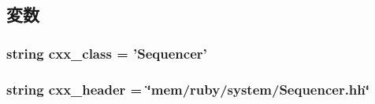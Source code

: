 \subsection{変数}
\hypertarget{classSequencer_1_1RubySequencer_a58cd55cd4023648e138237cfc0822ae3}{
\subsubsection[{cxx\_\-class}]{\setlength{\rightskip}{0pt plus 5cm}string {\bf cxx\_\-class} = '{\bf Sequencer}'}}
\label{classSequencer_1_1RubySequencer_a58cd55cd4023648e138237cfc0822ae3}
\hypertarget{classSequencer_1_1RubySequencer_a17da7064bc5c518791f0c891eff05fda}{
\subsubsection[{cxx\_\-header}]{\setlength{\rightskip}{0pt plus 5cm}string {\bf cxx\_\-header} = \char`\"{}mem/ruby/{\bf system}/Sequencer.hh\char`\"{}}}
\label{classSequencer_1_1RubySequencer_a17da7064bc5c518791f0c891eff05fda}


